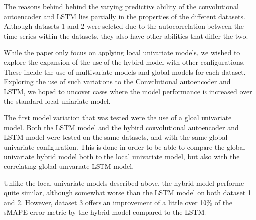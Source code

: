 The reasons behind behind the varying predictive ability of the convolutional autoencoder and LSTM lies partially
in the properties of the different datasets.
Although datasets 1 and 2 were selcted due to the autocorrelation between the time-series within the datasets,
they also have other abilities that differ the two.




  



While the paper \cite{Zhao2019} only focus on applying local univariate models,
we wished to explore the expansion of the use of the hybird model with other configurations.
These inclde the use of multivariate models and global models for each dataset.
Exploring the use of such variations to the Convolutional autoencoder and LSTM,
we hoped to uncover cases where the model performance is increased over the standard local uniariate model.



The first model variation that was tested were the use of a gloal univariate model.
Both the LSTM model and the hybird convolutional autoencoder and LSTM model were tested on the same datasets,
and with the same global univariate configuration.
This is done in order to be able to compare the global univariate hybrid model both to the local univariate model,
but also with the correlating global univariate LSTM model.

Unlike the local univariate models described above, the hybrid model performe quite similar, although somewhat worse than the LSTM model
on both dataset 1 and 2.
However, dataset 3 offers an improvement of a little over 10\% of the sMAPE error metric by the hybrid model compared to the LSTM.


